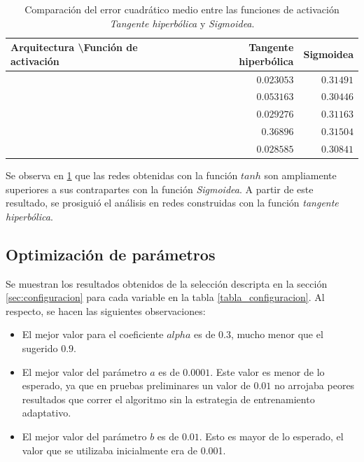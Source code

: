 \documentclass[a4paper,10pt]{article}
\begin{document}
     \begin{table}[H]

        \begin{center}
        \begin{tabular}{|l|r|r|}
            \hline
            Arquitectura \textbackslash Función de activación & Tangente hiperbólica & Sigmoidea \\
            \hline
            [2 5 4 1] & $0.023053$ & $0.31491$ \\
            \hline
            [3 10 6 1] & $0.053163$ & $0.30446$  \\
            \hline
            [2 10 6 1] & $0.029276$ & $0.31163$  \\
            \hline
            [2 4 2 1]  & $0.36896$ & $0.31504$  \\
            \hline
            [3 14 8 1] & $0.028585$ & $0.30841$  \\
            \hline
        \end{tabular}
        \end{center}
        \caption{Comparación del error cuadrático medio entre las funciones de activación \textit{Tangente hiperbólica} y \textit{Sigmoidea}.}
        \label{table-comparation-act-functions}

    \end{table}

    Se observa en \ref{table-comparation-act-functions} que las redes obtenidas con la función $tanh$ son ampliamente superiores a sus contrapartes con la función \textit{Sigmoidea}.
    A partir de este resultado, se prosiguió el análisis en redes construidas con la función \textit{tangente hiperbólica}.

    \subsection{Optimización de parámetros}
    \label{sec:parametros-optimos}

        Se muestran los resultados obtenidos de la selección descripta en la sección \ref{sec:configuracion} para cada variable en la tabla \ref{tabla_configuracion}. 
        Al respecto, se hacen las siguientes observaciones:

        \begin{itemize}
        \item El mejor valor para el coeficiente $alpha$ es de $0.3$, mucho
        menor que el sugerido $0.9$.
        \item El mejor valor del parámetro $a$ es de $0.0001$. Este valor es menor de lo esperado, ya que en pruebas preliminares un valor de $0.01$ 
              no arrojaba peores resultados que correr el algoritmo sin la estrategia de entrenamiento adaptativo.
        \item El mejor valor del parámetro $b$ es de $0.01$. Esto es mayor de lo esperado, el valor que se utilizaba inicialmente era de 0.001.
        \end{itemize}
\end{document}
